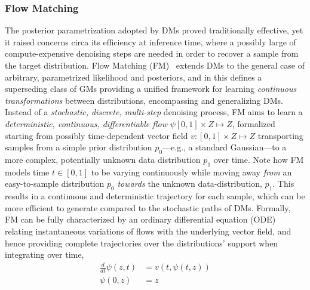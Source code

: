 \subsubsection{Flow Matching}
\label{sec:ch4-flow-matching}
 
The posterior parametrization adopted by DMs proved traditionally effective, yet it raised concerns circa its efficiency at inference time, where a possibly large of compute-expensive denoising steps are needed in order to recover a sample from the target distribution. 
Flow Matching (FM)~\citep{lipmanFlowMatchingGenerative2023} extends DMs to the general case of arbitrary, parametrized likelihood and posteriors, and in this defines a superseding class of GMs providing a unified framework for learning \emph{continuous transformations} between distributions, encompassing and generalizing DMs.
Instead of a \emph{stochastic, discrete, multi-step} denoising process, FM aims to learn a \emph{deterministic, continuous, differentiable flow} \( \psi [0,1] \times Z \mapsto Z \), formalized starting from possibly time-dependent vector field \( v: [0,1] \times Z \mapsto Z \) transporting samples from a simple prior distribution \( p_0 \)---e.g., a standard Gaussian---to a more complex, potentially unknown data distribution \( p_1 \) over time.
Note how FM models time \( t \in [0,1] \) to be varying continuously while moving away \emph{from} an easy-to-sample distribution \( p_0 \) \emph{towards} the unknown data-distribution, \( p_1 \). 
This results in a continuous and deterministic trajectory for each sample, which can be more efficient to generate compared to the stochastic paths of DMs.
Formally, FM can be fully characterized by an ordinary differential equation (ODE) relating instantaneous variations of flows with the underlying vector field, and hence providing complete trajectories over the distributions' support when integrating over time,
\begin{align}
    \frac{d}{dt} \psi(z, t) &= v(t, \psi(t, z)) \\
    \psi(0, z) &= z
\end{align}

